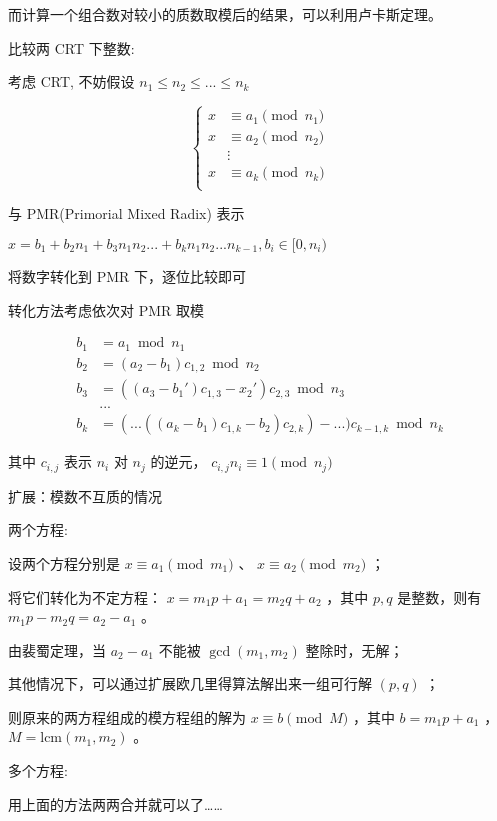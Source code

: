 而计算一个组合数对较小的质数取模后的结果，可以利用卢卡斯定理。

比较两 CRT 下整数:

考虑 CRT, 不妨假设 $n_1\leq n_2 \leq ... \leq n_k$ 

$$
\begin{cases}
x &\equiv a_1 \pmod {n_1} \\
x &\equiv a_2 \pmod {n_2} \\
  &\vdots \\
x &\equiv a_k \pmod {n_k} \\
\end{cases}
$$

与 PMR(Primorial Mixed Radix) 表示

 $x=b_1+b_2n_1+b_3n_1n_2...+b_kn_1n_2...n_{k-1} ,b_i\in [0,n_i)$ 

将数字转化到 PMR 下，逐位比较即可

转化方法考虑依次对 PMR 取模

$$
\begin{aligned}
b_1&=a_1 \bmod n_1\\
b_2&=(a_2-b_1)c_{1,2} \bmod n_2\\
b_3&=((a_3-b_1')c_{1,3}-x_2')c_{2,3} \bmod n_3\\
&...\\
b_k&=(...((a_k-b_1)c_{1,k}-b_2)c_{2,k})-...)c_{k-1,k} \bmod n_k
\end{aligned}
$$

其中 $c_{i,j}$ 表示 $n_i$ 对 $n_j$ 的逆元， $c_{i,j}n_i \equiv 1 \pmod {n_j}$ 

扩展：模数不互质的情况

两个方程:

设两个方程分别是 $x\equiv a_1 \pmod {m_1}$ 、 $x\equiv a_2 \pmod {m_2}$ ；

将它们转化为不定方程： $x=m_1p+a_1=m_2q+a_2$ ，其中 $p, q$ 是整数，则有 $m_1p-m_2q=a_2-a_1$ 。

由裴蜀定理，当 $a_2-a_1$ 不能被 $\gcd(m_1,m_2)$ 整除时，无解；

其他情况下，可以通过扩展欧几里得算法解出来一组可行解 $(p, q)$ ；

则原来的两方程组成的模方程组的解为 $x\equiv b\pmod M$ ，其中 $b=m_1p+a_1$ ， $M=\text{lcm}(m_1, m_2)$ 。

多个方程:

用上面的方法两两合并就可以了……